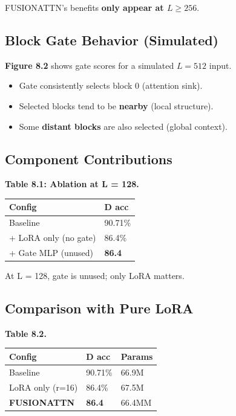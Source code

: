 FUSIONATTN's benefits \textbf{only appear at $L \geq 256$}.

\subsection{Block Gate Behavior (Simulated)}

\textbf{Figure 8.2} shows gate scores for a simulated $L = 512$ input. 

\begin{itemize}
\item Gate consistently selects block 0 (attention sink).
\item Selected blocks tend to be \textbf{nearby} (local structure).
\item Some \textbf{distant blocks} are also selected (global context).

\end{itemize}
\subsection{Component Contributions}

\textbf{Table 8.1: Ablation at L = 128.}

\begin{table}[H]
\centering
\small
\begin{tabular}{ll}
\toprule
\textbf{Config} & \textbf{D acc} \\
\midrule
Baseline & 90.71\% \\
+ LoRA only (no gate) & 86.4\% \\
+ Gate MLP (unused) & \textbf{86.4} \\
\bottomrule
\end{tabular}
\end{table}

At L = 128, gate is unused; only LoRA matters.

\subsection{Comparison with Pure LoRA}

\textbf{Table 8.2.}

\begin{table}[H]
\centering
\small
\begin{tabular}{lll}
\toprule
\textbf{Config} & \textbf{D acc} & \textbf{Params} \\
\midrule
Baseline & 90.71\% & 66.9M \\
LoRA only (r=16) & 86.4\% & 67.5M \\
\textbf{FUSIONATTN} & \textbf{86.4} & 66.4MM \\
\bottomrule
\end{tabular}
\end{table}

